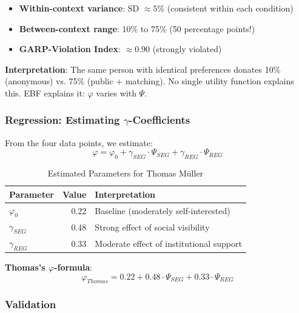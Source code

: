 \begin{itemize}
\item \textbf{Within-context variance}: SD $\approx 5\%$ (consistent within each condition)
\item \textbf{Between-context range}: 10\% to 75\% (50 percentage points!)
\item \textbf{GARP-Violation Index}: $\approx 0.90$ (strongly violated)
\end{itemize}

\textbf{Interpretation}: The same person with identical preferences donates 10\% (anonymous) vs. 75\% (public + matching). No single utility function explains this. EBF explains it: $\varphi$ varies with $\Psi$.

\subsubsection{Regression: Estimating $\gamma$-Coefficients}

From the four data points, we estimate:
\begin{equation}
\varphi = \varphi_0 + \gamma_{SEG} \cdot \Psi_{SEG} + \gamma_{REG} \cdot \Psi_{REG}
\end{equation}

\begin{table}[htbp]
\centering
\caption{Estimated Parameters for Thomas Müller}
\label{tab:phi-params}
\begin{tabular}{@{}lrl@{}}
\toprule
\textbf{Parameter} & \textbf{Value} & \textbf{Interpretation} \\
\midrule
$\varphi_0$ & 0.22 & Baseline (moderately self-interested) \\
$\gamma_{SEG}$ & 0.48 & Strong effect of social visibility \\
$\gamma_{REG}$ & 0.33 & Moderate effect of institutional support \\
\bottomrule
\end{tabular}
\end{table}

\textbf{Thomas's $\varphi$-formula}:
\begin{equation}
\boxed{\varphi_{Thomas} = 0.22 + 0.48 \cdot \Psi_{SEG} + 0.33 \cdot \Psi_{REG}}
\end{equation}

\subsubsection{Validation}

